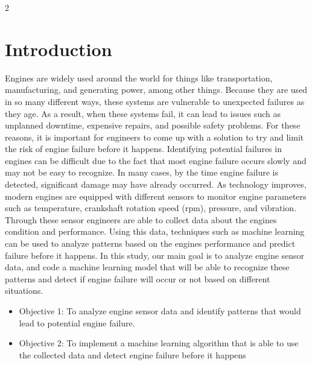 \documentclass[10pt, letterpaper]{article}
\begin{document}
\begin{multicols}{2}

\section{Introduction}
Engines are widely used around the world for things like transportation, manufacturing, and generating power, among other things. Because they are used in so many different ways, these systems are vulnerable to unexpected failures as they age. As a result, when these systems fail, it can lead to issues such as unplanned downtime, expensive repairs, and possible safety problems. For these reasons, it is important for engineers to come up with a solution to try and limit the risk of engine failure before it happens. 
Identifying potential failures in engines can be difficult due to the fact that most engine failure occurs slowly and may not be easy to recognize. In many cases, by the time engine failure is detected, significant damage may have already occurred. As technology improves, modern engines are equipped with different sensors to monitor engine parameters such as temperature, crankshaft rotation speed (rpm), pressure, and vibration. Through these sensor engineers are able to collect data about the engines condition and performance. 
Using this data, techniques such as machine learning can be used to analyze patterns based on the engines performance and predict failure before it happens. In this study, our main goal is to analyze engine sensor data, and code a machine learning model that will be able to recognize these patterns and detect if engine failure will occur or not based on different situations.

\begin{itemize}
    \item Objective 1: To analyze engine sensor data and identify patterns that would lead to potential engine failure.
    \item Objective 2: To implement a machine learning algorithm that is able to use the collected data and detect engine failure before it happens
\end{itemize}


\end{multicols}
\end{document}
